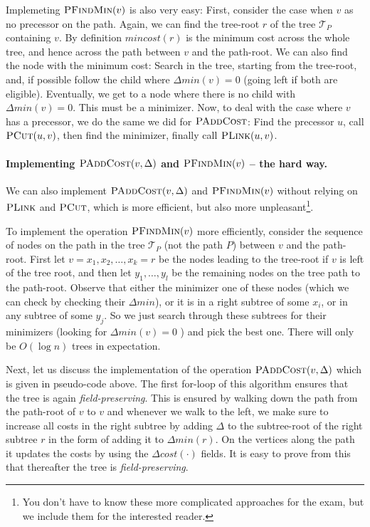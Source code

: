 Implemeting  $\textsc{PFindMin}(v)$ is also very easy: First, consider the case when $v$ as no precessor on the path.  Again, we can find the tree-root $r$ of the tree $\mathcal{T}_{P}$ containing $v$.
By definition $mincost(r)$ is the minimum cost across the whole tree, and hence across the path between $v$ and the path-root. We can also find the node with the minimum cost: Search in the tree, starting from the tree-root, and, if possible follow the child where $\Delta min(v)=0$ (going left if both are eligible). Eventually, we get to a node where there is no child with $\Delta min(v) = 0$. This must be a minimizer.
Now, to deal with the case where $v$ has a precessor, we do the same we did for $\textsc{PAddCost}$: Find the precessor $u$, call  $\textsc{PCut}(u,v)$, then find the minimizer, finally call  $\textsc{PLink}(u,v)$.

\paragraph{Implementing $\textsc{PAddCost}(v, \Delta)$ and $\textsc{PFindMin}(v)$ -- the hard way.}
We can also implement $\textsc{PAddCost}(v, \Delta)$ and $\textsc{PFindMin}(v)$ without relying on $\textsc{PLink}$ and $\textsc{PCut}$, which is more efficient, but also more unpleasant\footnote{You don't have to know these more complicated approaches for the exam, but we include them for the interested reader.}.

To implement the operation $\textsc{PFindMin}(v)$ more efficiently, consider the sequence of nodes on the path in the tree $\mathcal{T}_{P}$ (not the path $P$) between $v$ and the path-root. First let $v = x_1, x_2, \ldots, x_k = r$ be the nodes leading to the tree-root if $v$ is left of the tree root, and then let $y_1, \ldots, y_l$ be the remaining nodes on the tree path to the path-root.
Observe that either the minimizer one of these nodes (which we can check by checking their $\Delta min$), or it is in a right subtree of some $x_i$, or in any subtree of some $y_j$. So we just search through these subtrees for their minimizers (looking for  $\Delta min(v)=0$ ) and pick the best one. There will only be $O(\log n)$ trees in expectation.

Next, let us discuss the implementation of the operation $\textsc{PAddCost}(v, \Delta)$ which is given in pseudo-code above. The first for-loop of this algorithm ensures that the tree is again \emph{field-preserving}. This is ensured by walking down the path from the path-root of $v$ to $v$ and whenever we walk to the left, we make sure to increase all costs in the right subtree by adding $\Delta$ to the subtree-root of the right subtree $r$ in the form of adding it to $\Delta min(r)$. On the vertices along the path it updates the costs by using the $\Delta cost(\cdot)$ fields. It is easy to prove from this that thereafter the tree is  \emph{field-preserving}.

